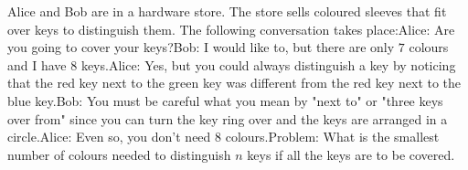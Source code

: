 Alice and Bob are in a hardware store. The store sells coloured sleeves that fit over keys to distinguish them. The following conversation takes place:Alice: Are you going to cover your keys?Bob: I would like to, but there are only $7$ colours and I have $8$ keys.Alice: Yes, but you could always distinguish a key by noticing that the red key next to the green key was different from the red key next to the blue key.Bob: You must be careful what you mean by "next to" or "three keys over from" since you can turn the key ring over and the keys are arranged in a circle.Alice: Even so, you don't need $8$ colours.Problem: What is the smallest number of colours needed to distinguish $n$ keys if all the keys are to be covered.